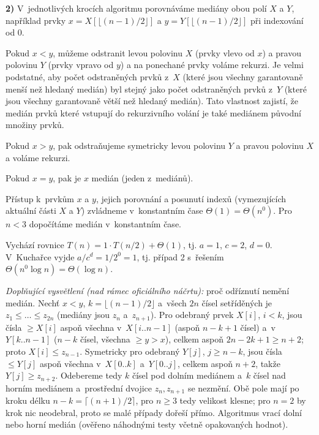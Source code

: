 \textbf{2)} V~jednotlivých krocích algoritmu porovnáváme mediány obou polí $X$ a $Y$,
například prvky $x = X[\lfloor (n-1)/2 \rfloor]$ a $y = Y[\lfloor (n-1)/2 \rfloor]$ při
indexování od 0.

Pokud $x < y$, můžeme odstranit levou polovinu $X$ (prvky vlevo od $x$) a pravou polovinu
$Y$ (prvky vpravo od $y$) a na ponechané prvky voláme rekurzi. Je velmi podstatné, aby
počet odstraněných prvků z~$X$ (které jsou všechny garantovaně menší než hledaný medián)
byl stejný jako počet odstraněných prvků z~$Y$ (které jsou všechny garantovaně větší než
hledaný medián). Tato vlastnost zajistí, že medián prvků které vstupují do rekurzivního
volání je také mediánem původní množiny prvků.

Pokud $x > y$, pak odstraňujeme symetricky levou polovinu $Y$ a pravou polovinu $X$
a voláme rekurzi.

Pokud $x = y$, pak je $x$ medián (jeden z~mediánů).

Přístup k~prvkům $x$ a $y$, jejich porovnání a posunutí indexů (vymezujících aktuální
části $X$ a $Y$) zvládneme v~konstantním čase $\Theta(1) = \Theta(n^0)$. Pro $n < 3$
dopočítáme medián v~konstantním čase.

Vychází rovnice $T(n) = 1 \cdot T(n/2) + \Theta(1)$, tj. $a = 1$, $c = 2$, $d = 0$.
V~Kuchařce vyjde $a/c^d = 1/2^0 = 1$, tj. případ 2 s~řešením
$\Theta(n^0 \log n) = \Theta(\log n)$.

\medskip
\noindent\textit{Doplňující vysvětlení (nad rámec oficiálního náčrtu):} proč odříznutí
nemění medián. Nechť $x<y$, $k=\lfloor(n-1)/2\rfloor$ a~všech $2n$ čísel setříděných je
$z_1\le\dots\le z_{2n}$ (mediány jsou $z_n$ a~$z_{n+1}$). Pro odebraný prvek $X[i]$,
$i<k$, jsou čísla $\ge X[i]$ aspoň všechna v~$X[i..n-1]$ (aspoň $n-k+1$ čísel)
a~v~$Y[k..n-1]$ ($n-k$ čísel, všechna $\ge y>x$), celkem aspoň $2n-2k+1\ge n+2$;
proto $X[i]\le z_{n-1}$. Symetricky pro odebraný $Y[j]$, $j\ge n-k$, jsou čísla
$\le Y[j]$ aspoň všechna v~$X[0..k]$ a~$Y[0..j]$, celkem aspoň $n+2$, takže
$Y[j]\ge z_{n+2}$. Odebereme tedy $k$ čísel pod dolním mediánem a~$k$ čísel nad
horním mediánem a~prostřední dvojice $z_n, z_{n+1}$ se nezmění. Obě pole mají po
kroku délku $n-k=\lceil (n+1)/2\rceil$, pro $n\ge3$ tedy velikost klesne; pro $n=2$ by
krok nic neodebral, proto se malé případy dořeší přímo. Algoritmus vrací dolní nebo
horní medián (ověřeno náhodnými testy včetně opakovaných hodnot).

